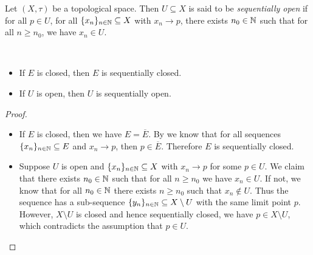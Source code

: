 \documentclass{techreport}
\begin{document}
\begin{definition}\label{De:SequentiallyOpen}
	Let $(X,\tau)$ be a topological space.
	Then $U \subseteq X$ is said to be \emph{sequentially open} if for all $p \in U$, for all $\{x_n\}_{n \in \mathbb{N}} \subseteq X$ with $x_n \rightarrow p$, there exists $n_0 \in \mathbb{N}$ such that for all $n \ge n_0$, we have $x_n \in U$.
\end{definition}

\begin{proposition}\label{Prop:ClosedOpenImplySeqClosedOpen}\
	\begin{itemize}
		\item If $E$ is closed, then $E$ is sequentially closed.
		\item If $U$ is open, then $U$ is sequentially open.
	\end{itemize}
\end{proposition}
\begin{proof}
	\begin{itemize}
		\item If $E$ is closed, then we have $E = \overline{E}$.
		By  we know that for all sequences $\{x_n\}_{n \in \mathbb{N}} \subseteq E$ and $x_n \rightarrow p$, then $p \in \overline{E}$.
		Therefore $E$ is sequentially closed.
		
		\item Suppose $U$ is open and $\{x_n\}_{n \in \mathbb{N}} \subseteq X$ with $x_n \rightarrow p$ for some $p \in U$.
		We claim that there exists $n_0 \in \mathbb{N}$ such that for all $n \ge n_0$ we have $x_n \in U$.
		If not, we know that for all $n_0 \in \mathbb{N}$ there exists $n \ge n_0$ such that $x_n \not\in U$.
		Thus the sequence has a sub-sequence $\{y_n\}_{n \in \mathbb{N}} \subseteq X \setminus U$ with the same limit point $p$.
		However, $X \setminus U$ is closed and hence sequentially closed, we have $p \in X \setminus U$, which contradicts the assumption that $p \in U$.
	\end{itemize}
\end{proof}
\end{document}
